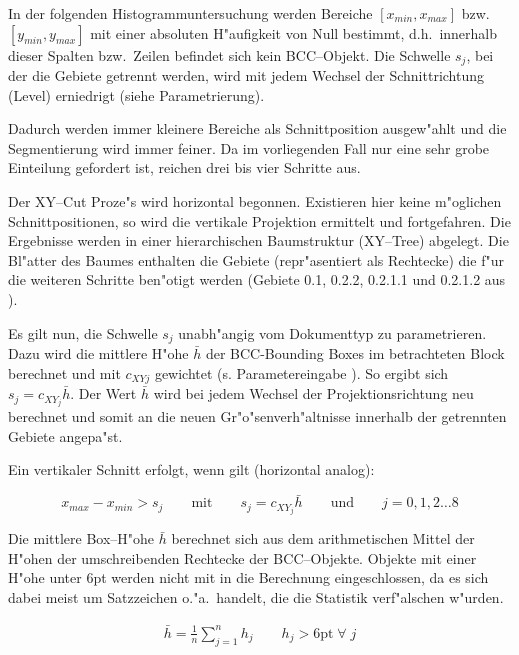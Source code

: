 
In der folgenden Histogrammuntersuchung werden Bereiche $[x_{min}, x_{max}]$ bzw.\
$[y_{min}, y_{max}]$ mit einer absoluten H"aufigkeit von Null bestimmt, d.h.\ innerhalb dieser
Spalten bzw.\ Zeilen befindet sich kein BCC--Objekt. Die Schwelle
$s_j$, bei der die Gebiete getrennt werden, wird mit jedem Wechsel der
Schnittrichtung (Level) erniedrigt (siehe Parametrierung).

Dadurch werden immer kleinere Bereiche
als Schnittposition ausgew"ahlt und die Segmentierung wird immer feiner. Da im vorliegenden Fall
nur eine sehr grobe Einteilung gefordert ist, reichen drei bis vier Schritte aus.

Der XY--Cut Proze"s wird horizontal begonnen. Existieren hier
keine m"oglichen Schnittpositionen, so wird die vertikale Projektion ermittelt und fortgefahren.
Die Ergebnisse werden in einer hierarchischen Baumstruktur (XY--Tree) abgelegt. Die Bl"atter
des Baumes enthalten die Gebiete (repr"asentiert als Rechtecke)
die f"ur die weiteren Schritte ben"otigt werden
(Gebiete 0.1, 0.2.2, 0.2.1.1 und 0.2.1.2 aus ).



Es gilt nun, die Schwelle $s_j$ unabh"angig vom Dokumenttyp zu parametrieren.
Dazu wird die mittlere H"ohe $\bar{h}$ der BCC-Bounding Boxes im betrachteten Block
berechnet und mit $c_{XYj}$ gewichtet (s. Parametereingabe ).
So ergibt sich $s_j = c_{XY_j}\bar{h}$. Der Wert $\bar{h}$ wird bei jedem Wechsel der
Projektionsrichtung neu berechnet
und somit an die neuen Gr"o"senverh"altnisse innerhalb der getrennten Gebiete angepa"st.

Ein vertikaler Schnitt erfolgt, wenn gilt (horizontal analog):

$$x_{max} - x_{min} > s_j \qquad\mbox{mit}\qquad s_j = c_{XY_j}\bar{h}
  \qquad\mbox{und}\qquad j=0,1,2\ldots 8$$

Die mittlere Box--H"ohe $\bar{h}$ berechnet sich aus dem arithmetischen Mittel der H"ohen der
umschreibenden Rechtecke der BCC--Objekte. Objekte mit einer H"ohe unter 6pt werden nicht mit in die
Berechnung eingeschlossen, da es sich dabei meist um Satzzeichen o."a.\ handelt, die die
Statistik verf"alschen w"urden.

\begin{eqnarray}\label{MeanHeight}
  \bar{h} = \frac{1}{n} \sum_{j=1}^n h_j \qquad h_j > 6\mbox{pt} \;\forall\; j
\end{eqnarray}

